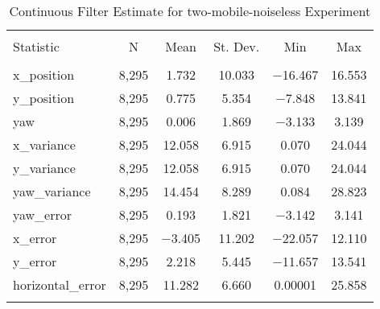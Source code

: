 
\begin{table}[h] \centering 
  \caption{Continuous Filter Estimate for two-mobile-noiseless Experiment} 
  \label{tab:two_mobile_noiseless_continuous_summary} 
\begin{tabular}{@{\extracolsep{5pt}}lccccc} 
\\[-1.8ex]\hline 
\hline \\[-1.8ex] 
Statistic & \multicolumn{1}{c}{N} & \multicolumn{1}{c}{Mean} & \multicolumn{1}{c}{St. Dev.} & \multicolumn{1}{c}{Min} & \multicolumn{1}{c}{Max} \\ 
\hline \\[-1.8ex] 
x\_position & 8,295 & 1.732 & 10.033 & $-$16.467 & 16.553 \\ 
y\_position & 8,295 & 0.775 & 5.354 & $-$7.848 & 13.841 \\ 
yaw & 8,295 & 0.006 & 1.869 & $-$3.133 & 3.139 \\ 
x\_variance & 8,295 & 12.058 & 6.915 & 0.070 & 24.044 \\ 
y\_variance & 8,295 & 12.058 & 6.915 & 0.070 & 24.044 \\ 
yaw\_variance & 8,295 & 14.454 & 8.289 & 0.084 & 28.823 \\ 
yaw\_error & 8,295 & 0.193 & 1.821 & $-$3.142 & 3.141 \\ 
x\_error & 8,295 & $-$3.405 & 11.202 & $-$22.057 & 12.110 \\ 
y\_error & 8,295 & 2.218 & 5.445 & $-$11.657 & 13.541 \\ 
horizontal\_error & 8,295 & 11.282 & 6.660 & 0.00001 & 25.858 \\ 
\hline \\[-1.8ex] 
\end{tabular} 
\end{table} 
